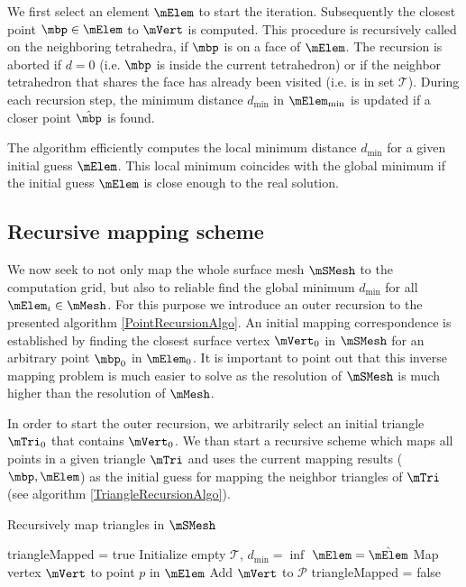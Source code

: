 We first select an element $\mElem$ to start the iteration. Subsequently the closest point $\mbp \in \mElem$ to $\mVert$ is computed. This procedure is recursively called on the neighboring tetrahedra, if $\mbp$ is on a face of $\mElem$. The recursion is aborted if $d=0$ (i.e. $\mbp$ is inside the current tetrahedron) or if the neighbor tetrahedron that shares the face has already been visited (i.e. is in set $\mathcal{T}$). During each recursion step, the minimum distance $d_{\min}$ in $\mElem_{\min}$ is updated if a closer point $\hat \mbp$ is found.

The algorithm efficiently computes the local minimum distance $d_{\min}$ for a given initial guess $\mElem$. This local minimum coincides with the global minimum if the initial guess $\mElem$ is close enough to the real solution.




\subsection{Recursive mapping scheme}			

We now seek to not only map the whole surface mesh $\mSMesh$ to the computation grid, but also to reliable find the global minimum $d_{\min}$ for all $\mElem_i \in \mMesh$. For this purpose we introduce an outer recursion to the presented algorithm \ref{PointRecursionAlgo}. An initial mapping correspondence is established by finding the closest surface vertex $\mVert_0$ in $\mSMesh$ for an arbitrary point $\mbp_0$ in $\mElem_0$. It is important to point out that this inverse mapping problem is much easier to solve as the resolution of $\mSMesh$ is much higher than the resolution of $\mMesh$.

In order to start the outer recursion, we arbitrarily select an initial triangle $\mTri_0$ that contains $\mVert_0$. We than start a recursive scheme which maps all points in a given triangle $\mTri$ and uses the current mapping results ($\mbp, \mElem$) as the initial guess for mapping the neighbor triangles of $\mTri$ (see algorithm \ref{TriangleRecursionAlgo}).


\begin{algorithm}  
\caption{Recursively map triangles in $\mSMesh$}
\label{TriangleRecursionAlgo}
  \begin{algorithmic}
	\State triangleMapped = true
	\State Initialize empty $\mathcal{T}$, $d_{\min} = \inf$
	\State {} 		
		\State $\mElem = \hat{\mElem}$ 
		\State Map vertex $\mVert$ to point $p$ in $\mElem$
		\State Add $\mVert$ to $\mathcal{P}$		
	\Else
		\State triangleMapped = false
	\EndIf	
	\EndIf
	\EndFor
	\State {}
	\EndFor	
	\EndIf
	\Return
	\EndProcedure
		
  \end{algorithmic}
\end{algorithm}

